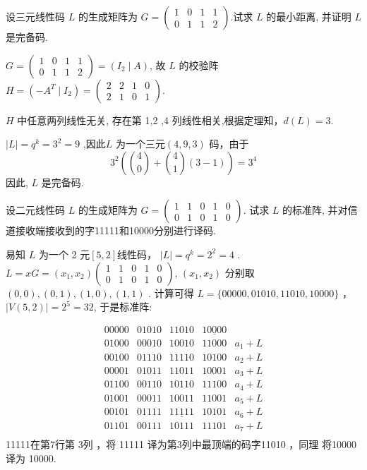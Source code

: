 \newpage
 \begin{tcolorbox}[breakable,colback=blue!5!white,colframe=blue!75!black,
 title= 解答题]
设三元线性码 $ L $ 的生成矩阵为
$
G=\left(\begin{array}{llll}
1 & 0 & 1 & 1 \\
0 & 1 & 1 & 2
\end{array}\right)
$.试求 $ L $ 的最小距离, 并证明 $ L $ 是完备码.

\tcblower
 $ G=\left(\begin{array}{ll|ll}1 & 0 & 1 & 1 \\ 0 & 1 & 1 & 2\end{array}\right)=\left(I_{2} \mid A\right) $, 故 $ L $ 的校验阵 $H= \left(-A^{T} \mid I_{2}\right)=\left(\begin{array}{llll}2 & 2 & 1 & 0 \\ 2 & 1 & 0 & 1\end{array}\right)$. 

$ H $ 中任意两列线性无关, 存在第 1,2 ,4 列线性相关,根据定理知，$d(L)=3$. 

 $|L|=q^{k}=3^{2}=9$ ,因此$L$ 为一个三元$(4,9,3)$ 码，由于
$$
3^{2}\left(\binom{4}{0}+\binom{4}{1}(3-1)\right)=3^{4}
$$
因此, $ L $ 是完备码.
\end{tcolorbox}


 \begin{tcolorbox}[breakable,colback=blue!5!white,colframe=blue!75!black,
 title= 解答题]

设二元线性码 $ L $ 的生成矩阵为
$
G=\left(\begin{array}{lllll}
1 & 1 & 0 & 1 & 0 \\
0 & 1 & 0 & 1 & 0
\end{array}\right) .
$
试求 $ L $ 的标准阵, 并对信道接收端接收到的字11111和10000分别进行译码.
\tcblower

易知 $L$  为一个 2 元$[5,2]$线性码， $|L|=q^{k}=2^{2}=4$ .
$L=x G=\left(x_{1}, x_{2}\right)\left(\begin{array}{lllll}
1 & 1 & 0 & 1 & 0 \\
0 & 1 & 0 & 1 & 0
\end{array}\right)$,
$(x_{1}, x_{2})$ 分别取$(0,0),(0,1),(1,0),(1,1)$ . 计算可得 $L=\{00000,01010,11010,10000\}$ ，$|V(5,2)|=2^5=32$, 于是标准阵: 

$$
\begin{array}{lllll}
00000 & 01010 & 11010 & \underline{10000}  &\\
01000 & 00010 & 10010 & 11000 & a_{1}+L  \\
00100 & 01110 & 11110 & 10100 & a_{2}+L \\
00001 & 01011 & 11011 & 10001 & a_{3}+L \\
01100 & 00110 & 10110 & 11100 & a_{4}+L \\
01001 & 00011 & 10011 & 11001 & a_{5}+L \\
00101 & 01111 & \underline{11111} & 10101 & a_{6}+L \\
01101 & 00111 & 10111 & 11101 & a_{7}+L \\
\end{array} 
$$
11111在第7行第 3列 ，将 11111 译为第3列中最顶端的码字11010 ，同理 将10000 译为 10000.
\end{tcolorbox}


